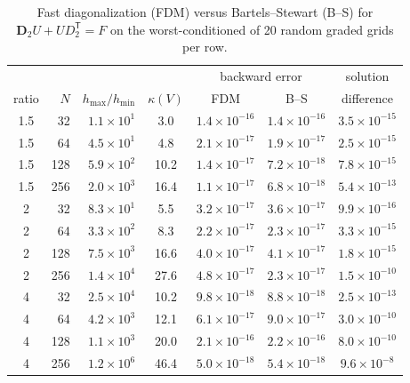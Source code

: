 \documentclass[11pt]{article}
\begin{document}
\begin{table}[htbp]\centering\small
\caption{Fast diagonalization (FDM) versus Bartels--Stewart (B--S) for $\mathbf D_2U+UD_2^{\mathsf T}=F$ on the worst-conditioned of 20 random graded grids per row.}
\begin{tabular}{cr r c ccc}
\toprule
& & & & \multicolumn{2}{c}{backward error} & solution\\
ratio & $N$ & $h_{\max}/h_{\min}$ & $\kappa(V)$ & FDM & B--S & difference\\
\midrule
1.5 & 32 & $1.1{\times}10^{1}$ & 3.0 & $1.4{\times}10^{-16}$ & $1.4{\times}10^{-16}$ & $3.5{\times}10^{-15}$\\
1.5 & 64 & $4.5{\times}10^{1}$ & 4.8 & $2.1{\times}10^{-17}$ & $1.9{\times}10^{-17}$ & $2.5{\times}10^{-15}$\\
1.5 & 128 & $5.9{\times}10^{2}$ & 10.2 & $1.4{\times}10^{-17}$ & $7.2{\times}10^{-18}$ & $7.8{\times}10^{-15}$\\
1.5 & 256 & $2.0{\times}10^{3}$ & 16.4 & $1.1{\times}10^{-17}$ & $6.8{\times}10^{-18}$ & $5.4{\times}10^{-13}$\\
2 & 32 & $8.3{\times}10^{1}$ & 5.5 & $3.2{\times}10^{-17}$ & $3.6{\times}10^{-17}$ & $9.9{\times}10^{-16}$\\
2 & 64 & $3.3{\times}10^{2}$ & 8.3 & $2.2{\times}10^{-17}$ & $2.3{\times}10^{-17}$ & $3.3{\times}10^{-15}$\\
2 & 128 & $7.5{\times}10^{3}$ & 16.6 & $4.0{\times}10^{-17}$ & $4.1{\times}10^{-17}$ & $1.8{\times}10^{-15}$\\
2 & 256 & $1.4{\times}10^{4}$ & 27.6 & $4.8{\times}10^{-17}$ & $2.3{\times}10^{-17}$ & $1.5{\times}10^{-10}$\\
4 & 32 & $2.5{\times}10^{4}$ & 10.2 & $9.8{\times}10^{-18}$ & $8.8{\times}10^{-18}$ & $2.5{\times}10^{-13}$\\
4 & 64 & $4.2{\times}10^{3}$ & 12.1 & $6.1{\times}10^{-17}$ & $9.0{\times}10^{-17}$ & $3.0{\times}10^{-10}$\\
4 & 128 & $1.1{\times}10^{3}$ & 20.0 & $2.1{\times}10^{-16}$ & $2.2{\times}10^{-16}$ & $8.0{\times}10^{-10}$\\
4 & 256 & $1.2{\times}10^{6}$ & 46.4 & $5.0{\times}10^{-18}$ & $5.4{\times}10^{-18}$ & $9.6{\times}10^{-8}$\\
\bottomrule
\end{tabular}
\end{table}
\end{document}
